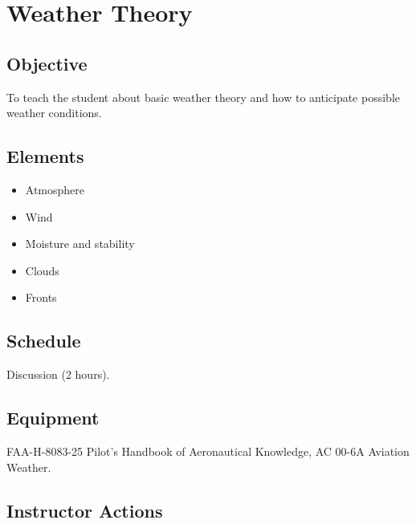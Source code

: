 \chapter{Weather Theory}

\section{Objective}

To teach the student about basic weather theory and how to anticipate possible
weather conditions.

\section{Elements}

\begin{itemize}
  \item Atmosphere
  \item Wind
  \item Moisture and stability
  \item Clouds
  \item Fronts
\end{itemize}

\section{Schedule}

Discussion (2 hours).

\section{Equipment}

FAA-H-8083-25 Pilot’s Handbook of Aeronautical Knowledge, AC 00-6A Aviation
Weather.

\section{Instructor Actions}

